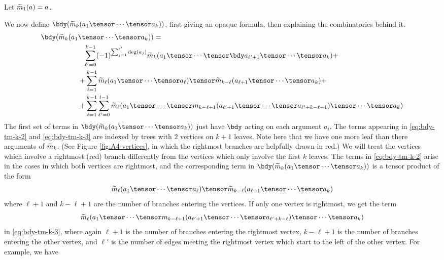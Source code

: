 \documentclass[11pt,leqno]{amsart}
\begin{document}
Let $\widetilde{m}_1(a) = a$.

We now define $\bdy(\tm_k(a_1 \tensor \cdots \tensor a_k))$, first giving an opaque formula, then explaining the combinatorics behind it.
\begin{align}
\notag \bdy(\tm_k(a_1 & \tensor \cdots \tensor a_k)) = \\
\label{eq:bdy-tm-k-1}   & \phantom{+} \sum_{\ell'=0}^{k-1} (-1)^{\sum_{j=1}^{\ell'} \deg(a_j)} \tm_k(a_1 \tensor \cdots \tensor \bdy a_{\ell'+1} \tensor \cdots \tensor a_k) + \\
\label{eq:bdy-tm-k-2}   &          +  \sum_{\ell=1}^{k-1} \tm_{\ell}(a_1 \tensor \cdots \tensor a_{\ell}) \tensor \tm_{k-\ell}(a_{\ell+1} \tensor \cdots \tensor a_k) + \\
\label{eq:bdy-tm-k-3}   &          +  \sum_{\ell=1}^{k-1} \sum_{\ell'=0}^{l-1} \tm_{\ell}(a_1 \tensor \cdots \tensor m_{k-\ell + 1}(a_{\ell' + 1} \tensor \cdots \tensor a_{\ell' + k - \ell + 1}) \tensor \cdots \tensor a_k)
\end{align}
The first set of terms in $\bdy(\tm_k(a_1 \tensor \cdots \tensor a_k))$ just have $\bdy$ acting on each argument $a_i$.
The terms appearing in \eqref{eq:bdy-tm-k-2} and \eqref{eq:bdy-tm-k-3} are indexed by trees with $2$ vertices on $k+1$ leaves.
Note here that we have one more leaf than there arguments of $\widetilde{m}_k$.
(See Figure \ref{fig:A4-vertices}, in which the rightmost branches are helpfully drawn in red.)
We will treat the vertices which involve a rightmost (red) branch differently from the vertices which only involve the first $k$ leaves.
The terms in \eqref{eq:bdy-tm-k-2} arise in the cases in which both
vertices are rightmost, and the corresponding term in $\bdy(\tm_k(a_1 \tensor \cdots \tensor a_k))$ is a tensor product of the form
$$\tm_{\ell}(a_1 \tensor \cdots \tensor a_{\ell}) \tensor \tm_{k-\ell}(a_{\ell+1} \tensor \cdots \tensor a_k)$$
where $\ell + 1$ and $k - \ell + 1$ are the number of branches entering the vertices.
If only one vertex is rightmost, we get the term $$\tm_{\ell}(a_1 \tensor \cdots \tensor m_{k-\ell+1}(a_{\ell' + 1} \tensor \cdots \tensor a_{\ell' + k - \ell}) \tensor \cdots \tensor a_k)$$
in \eqref{eq:bdy-tm-k-3},
where again $\ell + 1$ is the number of branches entering the rightmost vertex, $k-\ell+1$ is the number of branches entering the other vertex, and $\ell'$ is the number of edges meeting the rightmost vertex which start to the left of the other vertex.
For example, we have
\end{document}
